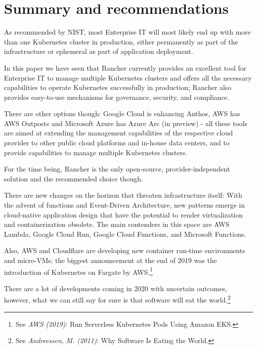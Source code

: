 %
%

\pagebreak
\section{Summary and recommendations}

\onehalfspacing

As recommended by NIST, most Enterprise IT will most likely end up with more than one Kubernetes cluster in production, either permanently as part of the infrastructure or ephemeral as part of application deployment.

In this paper we have seen that Rancher currently provides an excellent tool for Enterprise IT to manage multiple Kubernetes clusters and offers all the necessary capabilities to operate Kubernetes successfully in production; Rancher also provides easy-to-use mechanisms for governance, security, and compliance.

There are other options though: Google Cloud is enhancing Anthos, AWS has AWS Outposts and Microsoft Azure has Azure Arc (in preview) - all these tools are aimed at extending the management capabilities of the respective cloud provider to other public cloud platforms and in-house data centers, and to provide capabilities to manage multiple Kubernetes clusters.

For the time being, Rancher is the only open-source, provider-independent solution and the recommended choice though.

There are new changes on the horizon that threaten infrastructure itself: With the advent of functions and Event-Driven Architecture, new patterns emerge in cloud-native application design that have the potential to render virtualization and containerization obsolete. The main contenders in this space are AWS Lambda, Google Cloud Run, Google Cloud Functions, and Microsoft Functions.

Also, AWS and Cloudflare are developing new container run-time environments and micro-VMs; the biggest announcement at the end of 2019 was the introduction of Kubernetes on Fargate by AWS.\footnote{See \textit{AWS (2019)}: Run Serverless Kubernetes Pods Using Amazon EKS.\cite{eksFargate}}

There are a lot of developments coming in 2020 with uncertain outcomes, however, what we can still say for sure is that software will eat the world.\footnote{See \textit{Andreessen, M. (2011)}: Why Software Is Eating the World.\cite{softwareEats}}
